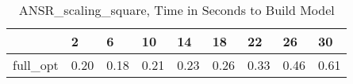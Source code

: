 \begin{table}
\caption{ANSR\_scaling\_square, Time in Seconds to Build Model}
\label{ANSR_scaling_square_model_time}
\begin{tabular}{lllllllll}
\toprule
 & 2 & 6 & 10 & 14 & 18 & 22 & 26 & 30 \\
\midrule
full\_opt & 0.20 & 0.18 & 0.21 & 0.23 & 0.26 & 0.33 & 0.46 & 0.61 \\
\bottomrule
\end{tabular}
\end{table}
